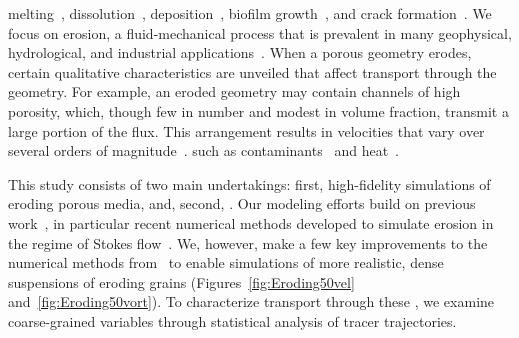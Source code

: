 \documentclass[preprint,10pt]{elsarticle}
\begin{document}
 melting~\cite{bec-vis1998, rycroft2016asymmetric, jambon2018singular, favier2019rayleigh, morrow2019moving}, dissolution~\cite{kan-zha-che-he2002, mac2015shape, moo2017, wykes2018self}, deposition~\cite{joh-eli1995,
hewett2018modelling}, biofilm growth~\cite{tan-val-wer2015}, and crack
formation~\cite{cho2019crack}. We focus on erosion, a fluid-mechanical
process that is prevalent in many geophysical, hydrological, and
industrial applications~\cite{berhanu2012shape, hewett2017evolution, lachaussee2018competitive, lopez2018cfd, allen2019sde, amin2019role}.  When a porous geometry erodes, certain qualitative characteristics are unveiled that affect transport through the geometry.  For example, an eroded geometry may
contain channels of high porosity, which, though few in number and
modest in volume fraction, transmit a large portion of the flux. This
arrangement results in velocities that vary over several orders of
magnitude~\cite{all-hea-lab-rei2002}.   such as contaminants~\cite{cve-che-wen1996,
dag1987, kon-bre1978} and heat~\cite{nil-sto1990, ree-sto1995}.

This study consists of two main undertakings: first, high-fidelity
simulations of eroding porous media, and, second, . Our modeling efforts build on previous work~\cite{ris-moo-chi-she-zha2012, moore2013self, moo2017}, in particular recent numerical methods developed to simulate erosion in the regime of Stokes flow~\cite{qua-moo2018}. We, however, make a few
key improvements to the numerical methods from~\cite{qua-moo2018} to
enable simulations of more realistic, dense suspensions of eroding
grains (Figures~\ref{fig:Eroding50vel} and~\ref{fig:Eroding50vort}).  To characterize transport through these , we examine
coarse-grained variables through statistical analysis of tracer
trajectories.
\end{document}
